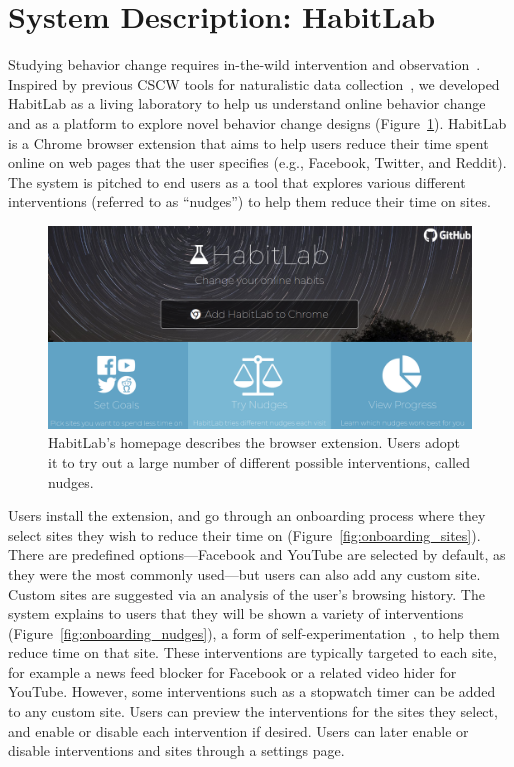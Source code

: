 \section{System Description: HabitLab}

Studying behavior change requires in-the-wild intervention and observation~\cite{consolvo2008activity}. Inspired by previous CSCW tools for naturalistic data collection~\cite{reinecke2015labinthewild}, we developed HabitLab as a living laboratory to help us understand online behavior change and as a platform to explore novel behavior change designs (Figure~\ref{fig:homepage}). HabitLab is a Chrome browser extension that aims to help users reduce their time spent online on web pages that the user specifies (e.g., Facebook, Twitter, and Reddit). The system is pitched to end users as a tool that explores various different interventions (referred to as ``nudges'') to help them reduce their time on sites.

\begin{figure}[b]
\includegraphics[width=\linewidth]{figures/homepage_cropped}
\caption{HabitLab's homepage describes the browser extension. Users adopt it to try out a large number of different possible interventions, called nudges.}
\label{fig:homepage}
\end{figure}

Users install the extension, and go through an onboarding process where they select sites they wish to reduce their time on (Figure~\ref{fig:onboarding_sites}). There are predefined options---Facebook and YouTube are selected by default, as they were the most commonly used---but users can also add any custom site. Custom sites are suggested via an analysis of the user's browsing history. The system explains to users that they will be shown a variety of interventions (Figure~\ref{fig:onboarding_nudges}), a form of self-experimentation~\cite{Karkar:2017:TFS:3025453.3025480}, to help them reduce time on that site. These interventions are typically targeted to each site, for example a news feed blocker for Facebook or a related video hider for YouTube. However, some interventions such as a stopwatch timer can be added to any custom site. Users can preview the interventions for the sites they select, and enable or disable each intervention if desired. Users can later enable or disable interventions and sites through a settings page.

